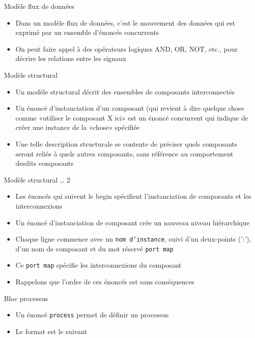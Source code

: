 \documentclass[presentation]{beamer}
\begin{document}
\begin{frame}[label={sec:orgc125c61}]{Modèle flux de données}
\begin{itemize}
\item Dans un modèle flux de données, c'est le mouvement des données qui est exprimé par un ensemble d'énoncés concurrents
\item On peut faire appel à des opérateurs logiques AND, OR, NOT, etc., pour décrire les relations entre les signaux
\end{itemize}
\end{frame}

\begin{frame}[label={sec:org55128ae}]{Modèle structural}
\begin{itemize}
\item Un modèle structural décrit des ensembles de composants interconnectés
\item Un énoncé d'instanciation d'un composant (qui revient à dire quelque chose comme «utiliser le composant X ici» est un énoncé concurrent qui indique de créer une instance de la «chose» spécifiée
\item Une telle description structurale se contente de préciser quels composants seront reliés à quels autres composants, sans référence au comportement desdits composants
\end{itemize}
\end{frame}

\begin{frame}[label={sec:org48513bc},fragile]{Modèle structural \ldots{} 2}
 \begin{itemize}
\item Les énoncés qui suivent le \alert{begin} spécifient l'instanciation de composants et les interconnexions
\item Un énoncé d'instanciation de composant crée un nouveau niveau hiérarchique
\item Chaque ligne commence avec un \texttt{nom d'instance}, suivi d'un deux-points (':'), d'un nom de composant et du mot réservé \alert{\texttt{port map}}
\item Ce \texttt{port map} spécifie les interconnexions du composant
\item Rappelons que l'ordre de ces énoncés est sans conséquences
\end{itemize}
\end{frame}

\begin{frame}[label={sec:org61fbc72},fragile]{Bloc processus}
 \begin{itemize}
\item Un énoncé \texttt{process} permet de définir un processus
\item Le format est le suivant
\end{itemize}
\end{frame}
\end{document}

